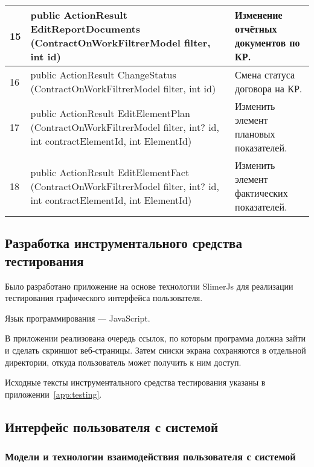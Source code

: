 \begin{footnotesize}
\begin{longtable}[h]{|p{}|p{}|p{}|}
	15 & public ActionResult EditReportDocuments (ContractOnWorkFiltrerModel filter, int id) & Изменение отчётных документов по КР. \\ \hline
	16 & public ActionResult ChangeStatus (ContractOnWorkFiltrerModel filter, int id) & Смена статуса договора на КР. \\ \hline
	17 & public ActionResult EditElementPlan (ContractOnWorkFiltrerModel filter, int? id, int contractElementId, int ElementId) & Изменить элемент плановых показателей. \\ \hline
	18 & public ActionResult EditElementFact (ContractOnWorkFiltrerModel filter, int? id, int contractElementId, int ElementId) & Изменить элемент фактических показателей. \\ \hline
\end{longtable}
\end{footnotesize}

\subsection{Разработка инструментального средства тестирования}

Было разработано приложение на основе технологии SlimerJs для реализации тестирования графического интерфейса пользователя.

Язык программирования --- JavaScript.

В приложении реализована очередь ссылок, по которым программа должна зайти и сделать скриншот веб-страницы.
Затем сниски экрана сохраняются в отдельной директории, откуда пользователь может получить к ним доступ.

Исходные тексты инструментального средства тестирования указаны в приложении~\ref{app:testing}.


\subsection{Интерфейс пользователя с системой}

\subsubsection{Модели и технологии взаимодействия пользователя с системой}

